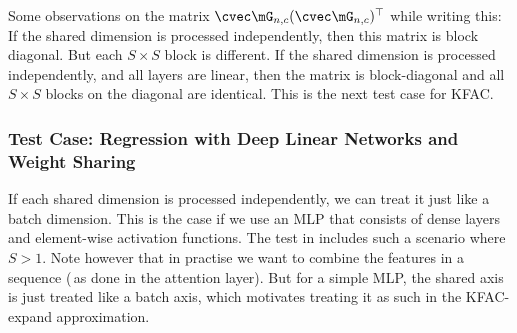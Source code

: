 Some observations on the matrix $\cvec \mG_{n,c} (\cvec \mG_{n,c})^{\top}$ while writing this: If the shared dimension is processed independently, then this matrix is block diagonal.
But each $S \times S$ block is different.
If the shared dimension is processed independently, and all layers are linear, then the matrix is block-diagonal and all $S \times S$ blocks on the diagonal are identical.
This is the next test case for KFAC.

\subsubsection{Test Case: Regression with Deep Linear Networks and Weight Sharing}\label{sec:expand_sharing}

If each shared dimension is processed independently, we can treat it just like a batch dimension.
This is the case if we use an MLP that consists of dense layers and element-wise activation functions.
The test in  includes such a scenario where $S > 1$.
Note however that in practise we want to combine the features in a sequence (\eg\,as done in the attention layer).
But for a simple MLP, the shared axis is just treated like a batch axis, which motivates treating it as such in the KFAC-expand approximation.

